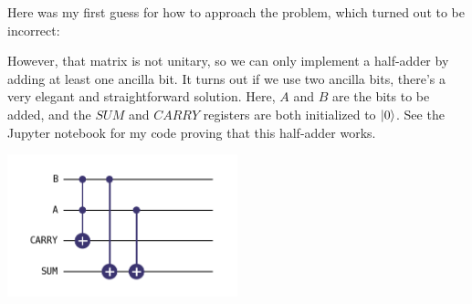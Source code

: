 \documentclass{article}
\begin{document}
\bigskip
\begin{prob}
\end{prob}
Here was my first guess for how to approach the problem, which turned out to be incorrect:
\par
\noindent{}\bigskip\par
However, that matrix is not unitary, so we can only implement a half-adder by adding at least one ancilla bit. It turns out if we use two ancilla bits, there's a very elegant and straightforward solution. Here, $A$ and $B$ are the bits to be added, and the $SUM$ and $CARRY$ registers are both initialized to $\left\lvert 0 \right\rangle$. See the Jupyter notebook for my code proving that this half-adder works.
\begin{center}
    \includegraphics[width=0.5\textwidth]{problem3.png}
\end{center}
\end{document}
